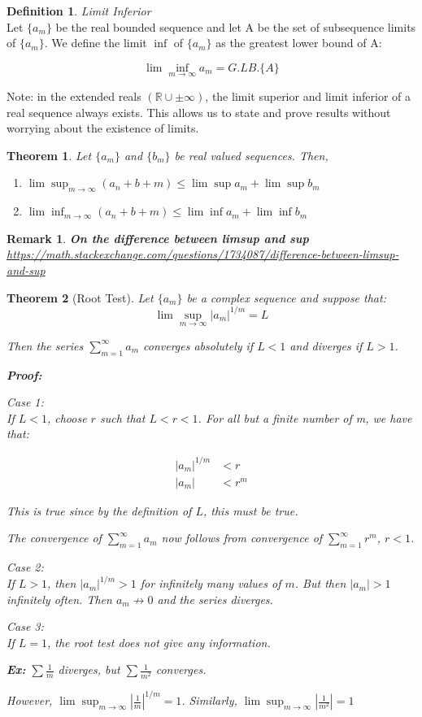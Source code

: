 \documentclass{article}
\newtheorem{theorem}{Theorem}[section]
\newtheorem*{remark}{Remark}
\theoremstyle{definition}
\newtheorem{definition}{Definition}[section]
\newcommand{\Def}[2]{
\begin{shaded*}
\begin{definition}{\textit{#1}}\\#2\end{definition}
\end{shaded*}
}
\def\R{\mathbb{R}}
\begin{document}
\Def{Limit Inferior}{Let $\{a_m\}$ be the real bounded sequence and let A be the set of subsequence limits of $\{a_m\}$. We define the limit $\inf$ of $\{a_m\}$ as the greatest lower bound of A:
	
	$$\lim\inf_{m \to \infty }a_m = G.LB.\{A\}$$
}

Note: in the extended reals $(\R \cup \pm \infty)$, the limit superior and limit inferior of a real sequence always exists. This allows us to state and prove results without worrying about the existence of limits.

\begin{theorem}
Let $\{a_m\}$ and $\{b_m\}$ be real valued sequences. Then, 
\begin{enumerate}
	\item $\lim \sup_{m \to \infty }(a_n + b+m) \leq \lim\sup a_m + \lim\sup b_m$
	\item $\lim \inf_{m \to \infty }(a_n + b+m) \leq \lim\inf a_m + \lim\inf b_m$
\end{enumerate}
\end{theorem}

\begin{remark}
\textbf{On the difference between limsup and sup}
\url{https://math.stackexchange.com/questions/1734087/difference-between-limsup-and-sup}

\end{remark}

\begin{theorem}[Root Test]
Let $\{a_m\}$ be a complex sequence and suppose that:
$$\lim\sup_{m \to \infty } |a_m|^{1/m} = L$$

Then the series $\sum_{m=1}^\infty a_m$ converges absolutely if $L<1$ and diverges if $L>1$. 

\textbf{Proof:}

Case 1: \\ 
If $L<1$, choose $r$ such that $L<r<1$. For all but a finite number of m, we have that:

\begin{align*}
|a_m|^{1/m} & < r \\ 
|a_m|&  < r^m  
\end{align*}

This is true since by the definition of $L$, this must be true. 

The convergence of $\sum_{m=1}^\infty a_m$ now follows from convergence of $\sum_{m=1}^\infty r^m$, $r<1$.

Case 2:\\
If $L>1$, then $|a_m|^{1/m} >1$ for infinitely many values of $m$. But then $|a_m|>1$ infinitely often. Then $a_m \not \to 0$ and the series diverges. 

Case 3: \\ 
If $L=1$, the root test does not give any information.

\textbf{Ex:} $\sum \frac{1}{m}$ diverges, but $\sum \frac{1}{m^2}$ converges.

 However, $\lim\sup_{m \to \infty }|\frac{1}{m}|^{1/m} = 1$. Similarly, $\lim\sup_{m \to \infty }|\frac{1}{m^2}| = 1$

\end{theorem}
\end{document}
